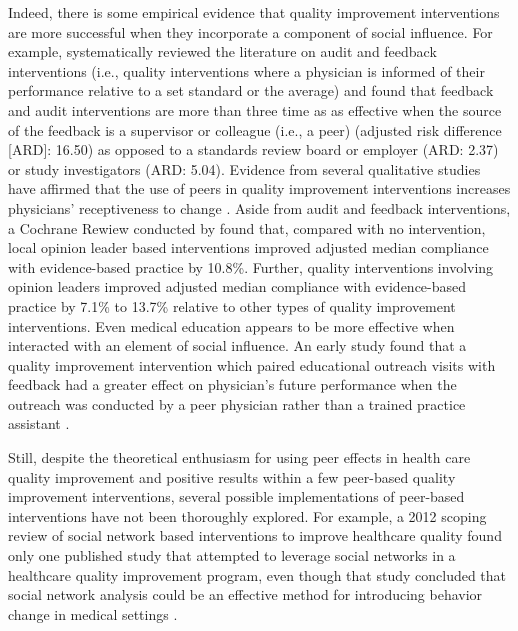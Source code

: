 \documentclass[12pt]{article}
\begin{document}
Indeed, there is some empirical evidence that quality improvement interventions are more successful when they incorporate a component of social influence. For example, \citet{iversAuditFeedbackEffects2012} systematically reviewed the literature on audit and feedback interventions (i.e., quality interventions where a physician is informed of their performance relative to a set standard or the average) and found that feedback and audit interventions are more than three time as as effective when the source of the feedback is a supervisor or colleague (i.e., a peer) (adjusted risk difference [ARD]: 16.50) as opposed to a standards review board or employer (ARD: 2.37) or study investigators (ARD: 5.04). Evidence from several qualitative studies have affirmed that the use of peers in quality improvement interventions increases physicians' receptiveness to change \citep{fergusonFactorsInfluencingEffectiveness2014}. Aside from audit and feedback interventions, a Cochrane Rewiew conducted by \citet{flodgrenLocalOpinionLeaders2019} found that, compared with no intervention, local opinion leader based interventions improved adjusted median compliance with evidence-based practice by 10.8\%. Further, quality interventions involving opinion leaders improved adjusted median compliance with evidence-based practice by 7.1\% to 13.7\% relative to other types of quality improvement interventions. Even medical education appears to be more effective when interacted with an element of social influence. An early study found that a quality improvement intervention which paired educational outreach visits with feedback had a greater effect on physician's future performance when the outreach was conducted by a peer physician rather than a trained practice assistant \citep{vandenhomberghPracticeVisitsTool1999}.

Still, despite the theoretical enthusiasm for using peer effects in health care quality improvement and positive results within a few peer-based quality improvement interventions, several possible implementations of peer-based interventions have not been thoroughly explored. For example, a 2012 scoping review of social network based interventions to improve healthcare quality \citep{cunninghamHealthProfessionalNetworks2012} found only one published study that attempted to leverage social networks in a healthcare quality improvement program, even though that study concluded that social network analysis could be an effective method for introducing behavior change in medical settings \citep{andersonDiffusionComputerApplications1990}.
\end{document}
